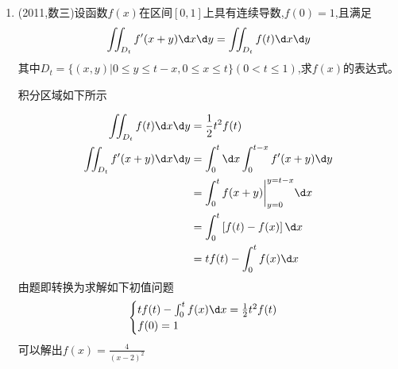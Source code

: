 \documentclass[12pt, a4paper, oneside, UTF8]{ctexbook}
\begin{document}
\begin{enumerate}[label=\arabic*.,start=22]
    \item (2011,数三)设函数$f(x)$在区间$[0,1]$上具有连续导数,$f(0)=1$,且满足
    \begin{align*}
        \iint_{D_t} f'(x+y)\d x\d y=\iint_{D_t} f(t)\d x\d y
    \end{align*}
    其中$D_t=\{(x,y)|0\leq y\leq t-x,0\leq x\leq t\}(0<t\leq1)$,求$f(x)$的表达式。
    
    \begin{solution}
        积分区域如下所示
        \begin{center}
        \end{center}
        \begin{align*}
            \iint_{D_t}f(t)\d x\d y &= \frac{1}{2}t^2f(t) \\
            \iint_{D_t}f'(x+y)\d x\d y 
            &= \int_{0}^{t}\d x\int_{0}^{t-x}f'(x+y)\d y \\
            &= \int_{0}^{t}f(x+y)\bigg|^{y=t-x}_{y=0}\d x \\
            &= \int_{0}^{t}\left[f(t)-f(x)\right]\d x \\
            &=tf(t)-\int_{0}^{t}f(x)\d x
        \end{align*}
        由题即转换为求解如下初值问题
        $$
        \begin{cases}
            tf(t)-\int_{0}^{t}f(x)\d x = \frac{1}{2}t^2f(t) \\
            f(0)= 1 
        \end{cases}
        $$
        可以解出$\displaystyle f(x)=\frac{4}{(x-2)^2}$
    \end{solution}
\end{enumerate}

\ifx\allfiles\undefined
\end{document}
